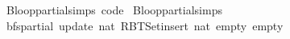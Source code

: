 \begin{isabellebody}
%
\endisadelimproof
\isanewline
{}\isamarkupfalse%
\ B{\isachardot}{\kern0pt}loop{\isacharunderscore}{\kern0pt}partial{\isachardot}{\kern0pt}simps\ {\isacharbrackleft}{\kern0pt}code{\isacharbrackright}{\kern0pt}\isanewline
{}\isamarkupfalse%
\ B{\isachardot}{\kern0pt}loop{\isacharunderscore}{\kern0pt}partial{\isachardot}{\kern0pt}simps\isanewline
{}\isamarkupfalse%
\ {\isachardoublequoteopen}bfs{\isacharunderscore}{\kern0pt}partial\ {\isacharparenleft}{\kern0pt}update\ {\isacharparenleft}{\kern0pt}{}{\isacharcolon}{\kern0pt}{\isacharcolon}{\kern0pt}nat{\isacharparenright}{\kern0pt}\ {\isacharparenleft}{\kern0pt}RBT{\isacharunderscore}{\kern0pt}Set{\isachardot}{\kern0pt}insert\ {\isacharparenleft}{\kern0pt}{}{\isacharcolon}{\kern0pt}{\isacharcolon}{\kern0pt}nat{\isacharparenright}{\kern0pt}\ empty{\isacharparenright}{\kern0pt}\ empty{\isacharparenright}{\kern0pt}\ {}{\isachardoublequoteclose}\isanewline
%
\isadelimtheory
\isanewline
%
\endisadelimtheory
%
\isatagtheory
{}\isamarkupfalse%
%
\endisatagtheory
{\isafoldtheory}%
%
\isadelimtheory
%
\endisadelimtheory
%
\end{isabellebody}%
\endinput
